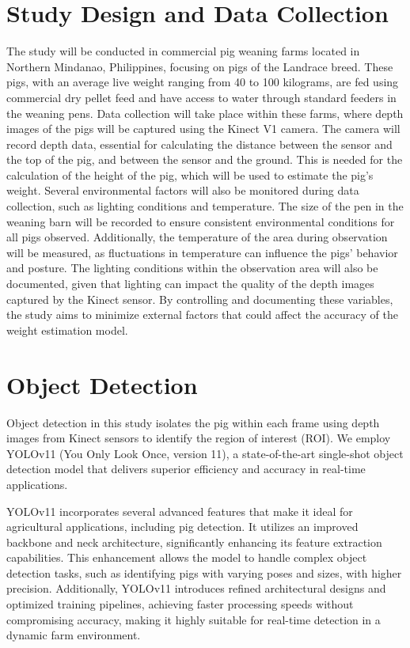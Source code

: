 {\section{Study Design and Data Collection}
The study will be conducted in commercial pig weaning farms located in Northern Mindanao, Philippines, focusing on pigs of the Landrace breed. These pigs, with an average live weight ranging from 40 to 100 kilograms, are fed using commercial dry pellet feed and have access to water through standard feeders in the weaning pens. Data collection will take place within these farms, where depth images of the pigs will be captured using the Kinect V1 camera. The camera will record depth data, essential for calculating the distance between the sensor and the top of the pig, and between the sensor and the ground. This is needed for the calculation of the height of the pig, which will be used to estimate the pig's weight.
Several environmental factors will also be monitored during data collection, such as lighting conditions and temperature. The size of the pen in the weaning barn will be recorded to ensure consistent environmental conditions for all pigs observed. Additionally, the temperature of the area during observation will be measured, as fluctuations in temperature can influence the pigs’ behavior and posture. The lighting conditions within the observation area will also be documented, given that lighting can impact the quality of the depth images captured by the Kinect sensor. By controlling and documenting these variables, the study aims to minimize external factors that could affect the accuracy of the weight estimation model.

\section{Object Detection}
Object detection in this study isolates the pig within each frame using depth images from Kinect sensors to identify the region of interest (ROI). We employ YOLOv11 (You Only Look Once, version 11), a state-of-the-art single-shot object detection model that delivers superior efficiency and accuracy in real-time applications.

YOLOv11 incorporates several advanced features that make it ideal for agricultural applications, including pig detection. It utilizes an improved backbone and neck architecture, significantly enhancing its feature extraction capabilities. This enhancement allows the model to handle complex object detection tasks, such as identifying pigs with varying poses and sizes, with higher precision. Additionally, YOLOv11 introduces refined architectural designs and optimized training pipelines, achieving faster processing speeds without compromising accuracy, making it highly suitable for real-time detection in a dynamic farm environment.

}
